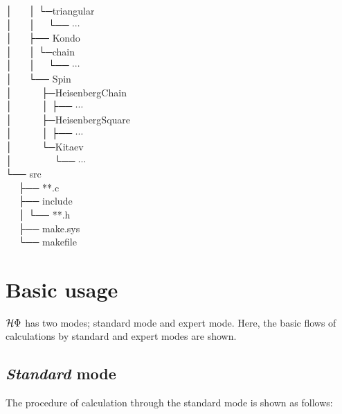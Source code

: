 │  ~~  │  └─triangular\\
│  ~~  │  ~~└── $\cdots$\\
│  ~~  ├── Kondo\\
│  ~~  │  └─chain\\
│  ~~  │  ~~└── $\cdots$\\
│  ~~  └── Spin\\
│  ~~  ~~  ├─HeisenbergChain\\
│  ~~  ~~  │  ├── $\cdots$\\
│  ~~  ~~  ├─HeisenbergSquare\\
│  ~~  ~~  │  ├── $\cdots$\\
│  ~~  ~~  └─Kitaev\\
│  ~~  ~~  ~~  └── $\cdots$\\
└── src\\
~~  ├── **.c\\
~~  ├── include\\
~~  │   └── **.h\\
~~  ├── make.sys\\
~~  └── makefile\\

\section{Basic usage}
$\mathcal{H} \Phi$ has two modes; standard mode and expert mode. Here, the basic flows of calculations by standard and expert modes are shown.

\subsection{{\it Standard} mode}

The procedure of calculation through the standard mode is shown as follows:

